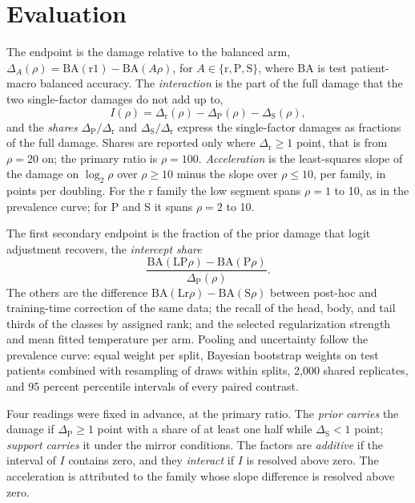 \documentclass[11pt]{article}
\begin{document}
\section{Evaluation}
\label{sec:evaluation}
The endpoint is the damage relative to the balanced arm, $\Delta_A(\rho)=\mathrm{BA}(\text{r1})-\mathrm{BA}(A\rho)$, for $A\in\{\text{r},\text{P},\text{S}\}$, where BA is test patient-macro balanced accuracy. The \emph{interaction} is the part of the full damage that the two single-factor damages do not add up to,
\begin{equation}
  I(\rho) = \Delta_\text{r}(\rho) - \Delta_\text{P}(\rho) - \Delta_\text{S}(\rho),
  \label{eq:interaction}
\end{equation}
\noindent and the \emph{shares} $\Delta_\text{P}/\Delta_\text{r}$ and $\Delta_\text{S}/\Delta_\text{r}$ express the single-factor damages as fractions of the full damage. Shares are reported only where $\Delta_\text{r}\geq1$ point, that is from $\rho=20$ on; the primary ratio is $\rho=100$. \emph{Acceleration} is the least-squares slope of the damage on $\log_2\rho$ over $\rho\geq10$ minus the slope over $\rho\leq10$, per family, in points per doubling. For the r family the low segment spans $\rho=1$ to 10, as in the prevalence curve; for P and S it spans $\rho=2$ to 10.

The first secondary endpoint is the fraction of the prior damage that logit adjustment recovers, the \emph{intercept share}
\begin{equation}
  \frac{\mathrm{BA}(\text{LP}\rho)-\mathrm{BA}(\text{P}\rho)}{\Delta_\text{P}(\rho)}.
  \label{eq:intercept-share}
\end{equation}
\noindent The others are the difference $\mathrm{BA}(\text{Lr}\rho)-\mathrm{BA}(\text{S}\rho)$ between post-hoc and training-time correction of the same data; the recall of the head, body, and tail thirds of the classes by assigned rank; and the selected regularization strength and mean fitted temperature per arm. Pooling and uncertainty follow the prevalence curve: equal weight per split, Bayesian bootstrap weights on test patients \citep{rubin1981bayesian} combined with resampling of draws within splits, 2,000 shared replicates, and 95 percent percentile intervals of every paired contrast.

Four readings were fixed in advance, at the primary ratio. The \emph{prior carries} the damage if $\Delta_\text{P}\geq1$ point with a share of at least one half while $\Delta_\text{S}<1$ point; \emph{support carries} it under the mirror conditions. The factors are \emph{additive} if the interval of $I$ contains zero, and they \emph{interact} if $I$ is resolved above zero. The acceleration is attributed to the family whose slope difference is resolved above zero.





\end{document}
